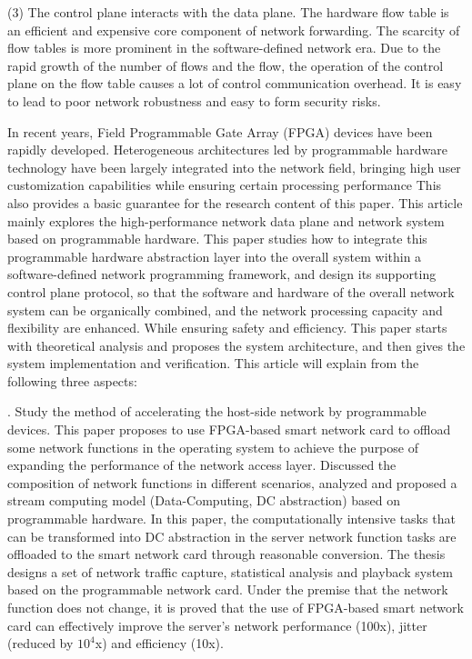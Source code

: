\noindent (3) The control plane interacts with the data plane. The hardware flow table is an efficient and expensive core component of network forwarding. The scarcity of flow tables is more prominent in the software-defined network era. Due to the rapid growth of the number of flows and the flow, the operation of the control plane on the flow table causes a lot of control communication overhead. It is easy to lead to poor network robustness and easy to form security risks. \newline

\noindent In recent years, Field Programmable Gate Array (FPGA) devices have been rapidly developed. Heterogeneous architectures led by programmable hardware technology have been largely integrated into the network field, bringing high user customization capabilities while ensuring certain processing performance This also provides a basic guarantee for the research content of this paper.
This article mainly explores the high-performance network data plane and network system based on programmable hardware. This paper studies how to integrate this programmable hardware abstraction layer into the overall system within a software-defined network programming framework, and design its supporting control plane protocol, so that the software and hardware of the overall network system can be organically combined, and the network processing capacity and flexibility are enhanced. While ensuring safety and efficiency. This paper starts with theoretical analysis and proposes the system architecture, and then gives the system implementation and verification. This article will explain from the following three aspects: \newline

. Study the method of accelerating the host-side network by programmable devices. This paper proposes to use FPGA-based smart network card to offload some network functions in the operating system to achieve the purpose of expanding the performance of the network access layer. Discussed the composition of network functions in different scenarios, analyzed and proposed a stream computing model (Data-Computing, DC abstraction) based on programmable hardware. In this paper, the computationally intensive tasks that can be transformed into DC abstraction in the server network function tasks are offloaded to the smart network card through reasonable conversion. The thesis designs a set of network traffic capture, statistical analysis and playback system based on the programmable network card. Under the premise that the network function does not change, it is proved that the use of FPGA-based smart network card can effectively improve the server's network performance (100x), jitter (reduced by $10^4$x) and efficiency (10x). \newline


